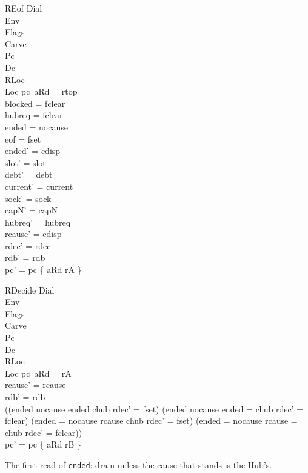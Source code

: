 \documentclass[a4paper,10pt,fleqn]{article}
\begin{document}
\begin{schema}{REof}
  \Delta Dial \\ \Xi Env \\ \Xi Flags \\ \Xi Carve \\ \Delta Pc \\ \Xi Dc \\
  \Delta RLoc \\ \Xi Loc
\where
  pc~aRd = rtop \\
  blocked = fclear \\
  hubreq = fclear \\
  ended = nocause \\
  eof = fset \\
  ended' = cdisp \\
  slot' = slot \\
  debt' = debt \\
  current' = current \\
  sock' = sock \\
  capN' = capN \\
  hubreq' = hubreq \\
  rcause' = cdisp \\
  rdec' = rdec \\
  rdb' = rdb \\
  pc' = pc \oplus \{ aRd \mapsto rA \}
\end{schema}

\begin{schema}{RDecide}
  \Xi Dial \\ \Xi Env \\ \Xi Flags \\ \Xi Carve \\ \Delta Pc \\ \Xi Dc \\
  \Delta RLoc \\ \Xi Loc
\where
  pc~aRd = rA \\
  rcause' = rcause \\
  rdb' = rdb \\
  ((ended \neq nocause \land ended \neq chub \land rdec' = fset) \lor
    (ended \neq nocause \land ended = chub \land rdec' = fclear) \lor
    (ended = nocause \land rcause \neq chub \land rdec' = fset) \lor
    (ended = nocause \land rcause = chub \land rdec' = fclear)) \\
  pc' = pc \oplus \{ aRd \mapsto rB \}
\end{schema}

The first read of \texttt{ended}: drain unless the cause that stands is the Hub's.
\end{document}
